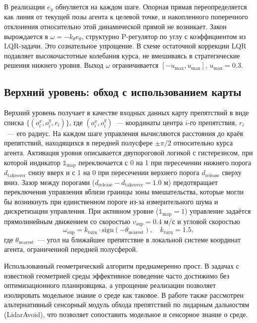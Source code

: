 \documentclass[11pt]{article}
\begin{document}
В реализации $e_y$ обнуляется на каждом шаге. Опорная прямая
переопределяется как линия от текущей позы агента к целевой точке, и
накопленного поперечного отклонения относительно этой динамической
прямой не возникает.
Закон вырождается в $\omega = -k_\theta e_\theta$, структурно
P-регулятор по углу с коэффициентом из LQR-задачи. Это сознательное упрощение. В схеме остаточной коррекции LQR подавляет высокочастотные колебания
курса, не вмешиваясь в стратегические решения нижнего уровня. Выход
$\omega$ ограничивается $[-u_{\max}, u_{\max}]$, $u_{\max} = 0.3$.


\subsection{Верхний уровень: обход с использованием карты}
\label{sec:supervisory}

Верхний уровень получает в качестве входных данных карту препятствий
в виде списка $\{(o^x_i, o^y_i, r_i)\}$, где $(o^x_i, o^y_i)$~--- координаты
центра $i$-го препятствия, $r_i$~--- его радиус. На каждом шаге управления
вычисляются расстояния до краёв препятствий, находящихся в передней
полусфере $\pm \pi/2$ относительно курса агента. Активация уровня
описывается двупороговой логикой с гистерезисом, при которой индикатор $\mathbb{1}_{\text{map}}$ переключается с 0 на 1 при пересечении нижнего порога $d_{\text{takeover}}$ снизу вверх и с 1 на 0 при пересечении верхнего порога $d_{\text{release}}$ сверху вниз. Зазор между порогами
($d_{\text{release}} - d_{\text{takeover}} = 1.0$ м) предотвращает
переключения управления вблизи границы зоны вмешательства, которые могли
бы возникнуть при единственном пороге из-за измерительного шума и
дискретизации управления. При активном уровне ($\mathbb{1}_{\text{map}} = 1$)
управление задаётся прямолинейным движением со скоростью
$v_{\mathrm{sup}} = 0.4$ м/с и угловой скоростью
\begin{equation}
\omega_{\mathrm{sup}} = k_{\mathrm{turn}} \cdot \mathrm{sign}(-\theta_{\mathrm{nearest}}),\quad k_{\mathrm{turn}} = 1.5,
\end{equation}
где $\theta_{\mathrm{nearest}}$~--- угол на ближайшее препятствие в локальной
системе координат агента, ограниченной передней полусферой.

Использованный геометрический алгоритм преднамеренно прост. В задачах
с известной геометрией среды эффективное поведение часто достижимо без
оптимизационного планировщика, а упрощение реализации позволяет изолировать модельное знание о среде как таковое. В работе также рассмотрен
альтернативный сенсорный модуль обхода препятствий по лидарным дальностям
(LidarAvoid), что позволяет сопоставить модельное и сенсорное знание о среде.
\end{document}
